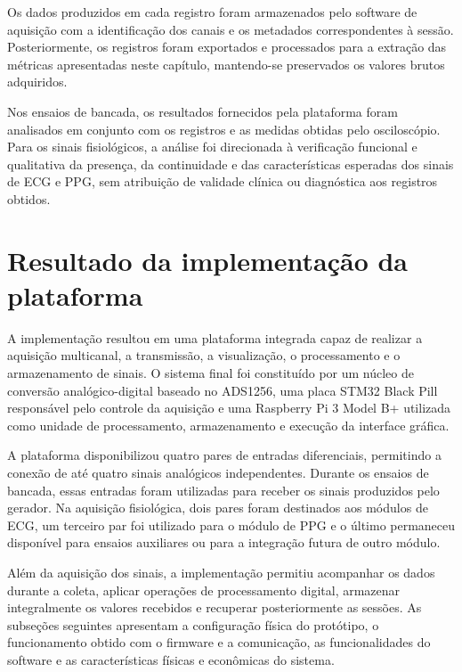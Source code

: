 \documentclass[a4paper,12pt]{fcte}
\begin{document}
Os dados produzidos em cada registro foram armazenados pelo software de aquisição com a identificação dos canais e os metadados correspondentes à sessão. Posteriormente, os registros foram exportados e processados para a extração das métricas apresentadas neste capítulo, mantendo-se preservados os valores brutos adquiridos.

Nos ensaios de bancada, os resultados fornecidos pela plataforma foram analisados em conjunto com os registros e as medidas obtidas pelo osciloscópio. Para os sinais fisiológicos, a análise foi direcionada à verificação funcional e qualitativa da presença, da continuidade e das características esperadas dos sinais de ECG e PPG, sem atribuição de validade clínica ou diagnóstica aos registros obtidos.

\section{Resultado da implementação da plataforma}
\label{sec:resultado_implementacao}

A implementação resultou em uma plataforma integrada capaz de realizar a aquisição multicanal, a transmissão, a visualização, o processamento e o armazenamento de sinais. O sistema final foi constituído por um núcleo de conversão analógico-digital baseado no ADS1256, uma placa STM32 Black Pill responsável pelo controle da aquisição e uma Raspberry Pi 3 Model B+ utilizada como unidade de processamento, armazenamento e execução da interface gráfica.

A plataforma disponibilizou quatro pares de entradas diferenciais, permitindo a conexão de até quatro sinais analógicos independentes. Durante os ensaios de bancada, essas entradas foram utilizadas para receber os sinais produzidos pelo gerador. Na aquisição fisiológica, dois pares foram destinados aos módulos de ECG, um terceiro par foi utilizado para o módulo de PPG e o último permaneceu disponível para ensaios auxiliares ou para a integração futura de outro módulo.

Além da aquisição dos sinais, a implementação permitiu acompanhar os dados durante a coleta, aplicar operações de processamento digital, armazenar integralmente os valores recebidos e recuperar posteriormente as sessões. As subseções seguintes apresentam a configuração física do protótipo, o funcionamento obtido com o firmware e a comunicação, as funcionalidades do software e as características físicas e econômicas do sistema.
\end{document}
